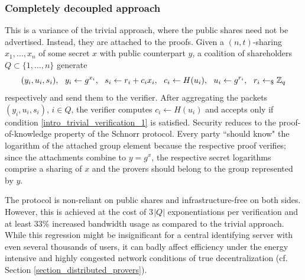 \documentclass{iacrtrans}
\begin{document}
\subsubsection{Completely decoupled approach}\label{section_decoupled_commitment}

This is a variance of the trivial approach,
where the public shares
need not be advertised.
Instead, they are attached to the proofs.
Given a $(n, t)$-sharing
$x_1, \dots, x_n$ of some secret $x$
with public counterpart $y$,
a coalition of shareholders
$Q \subset \{1, \dots, n\}$
generate
\vspace{5pt}
\begin{equation*}
(y_i, u_i, s_i),
\ \ y_i \leftarrow g ^ {x_i},
\ \ s_i \leftarrow r_i + c_i x_i,
\ \ c_i \leftarrow H(u_i),
\ \ u_i \leftarrow g ^ {r_i},
\ \ r_i \leftarrow_\$ \mathbb{Z}_q
\vspace{5pt}
\end{equation*}
respectively
and send them to the verifier.
After aggregating the packets
$(y_i, u_i, s_i)$, $i \in Q$,
the verifier computes $c_i \leftarrow H(u_i)$
and accepts only if condition
\eqref{intro_trivial_verification_1}
is satisfied.
Security reduces to the proof-of-knowledge
property of the Schnorr protocol.
Every party ``should know"
the logarithm of the attached group element
because the respective proof verifies;
since the attachments combine to $y = g ^ x$,
the respective secret logarithms comprise a sharing of
$x$ and the provers should belong to the group
represented by $y$.

The protocol is non-reliant on public shares and
infrastructure-free on both sides.
However, this is achieved at the cost of
$3\hspace{1pt}|Q|$ exponentiations per verification
and at least $33\%$ increased bandwidth usage
as compared to the trivial approach.
While this regression might be insignificant
for a central identifying server
with even several thousands of users,
it can badly affect efficiency under
the energy intensive and
highly congested network conditions
of true decentralization
(cf. Section \ref{section_distributed_provers}).
\end{document}

